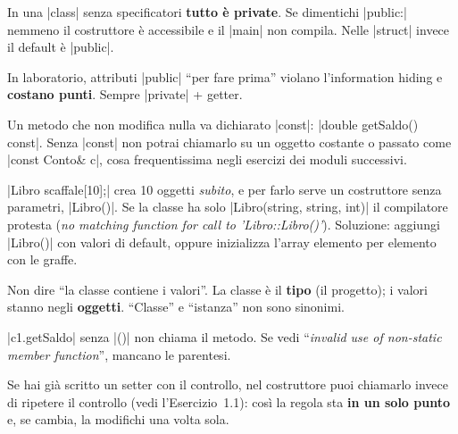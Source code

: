 \begin{trappola}
In una \cc|class| senza specificatori \textbf{tutto è private}. Se dimentichi
\cc|public:| nemmeno il costruttore è accessibile e il \cc|main| non compila.
Nelle \cc|struct| invece il default è \cc|public|.
\end{trappola}

\begin{trappola}
In laboratorio, attributi \cc|public| ``per fare prima'' violano l'information
hiding e \textbf{costano punti}. Sempre \cc|private| + getter.
\end{trappola}

\begin{trappola}
Un metodo che non modifica nulla va dichiarato \cc|const|:
\cc|double getSaldo() const|. Senza \cc|const| non potrai chiamarlo su un
oggetto costante o passato come \cc|const Conto& c|, cosa frequentissima negli
esercizi dei moduli successivi.
\end{trappola}

\begin{trappola}
\cc|Libro scaffale[10];| crea 10 oggetti \emph{subito}, e per farlo serve un
costruttore senza parametri, \cc|Libro()|. Se la classe ha solo
\cc|Libro(string, string, int)| il compilatore protesta (\emph{no matching
function for call to 'Libro::Libro()'}). Soluzione: aggiungi \cc|Libro()| con
valori di default, oppure inizializza l'array elemento per elemento con le graffe.
\end{trappola}

\begin{trappola}
Non dire ``la classe contiene i valori''. La classe è il \textbf{tipo} (il
progetto); i valori stanno negli \textbf{oggetti}. ``Classe'' e ``istanza'' non
sono sinonimi.
\end{trappola}

\begin{consiglio}
\cc|c1.getSaldo| senza \cc|()| non chiama il metodo. Se vedi
``\emph{invalid use of non-static member function}'', mancano le parentesi.
\end{consiglio}

\begin{consiglio}
Se hai già scritto un setter con il controllo, nel costruttore puoi chiamarlo
invece di ripetere il controllo (vedi l'Esercizio~1.1): così la regola sta
\textbf{in un solo punto} e, se cambia, la modifichi una volta sola.
\end{consiglio}


